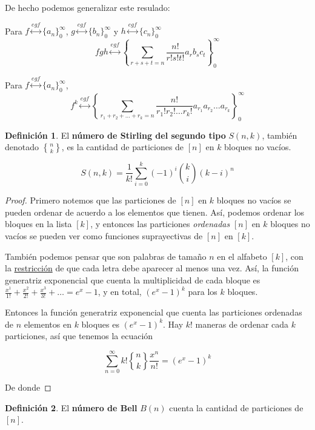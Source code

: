 \documentclass[spanish]{book}
\theoremstyle{definition}
\newtheorem*{defn}{Definición}
\DeclareRobustCommand{\stirling}{\genfrac\{\}{0pt}{}}
\begin{document}
De hecho podemos generalizar este resulado:
\begin{teo}	
	Para $f\overset{egf}{\longleftrightarrow}\{a_n\}_0^\infty$, $g\overset{egf}{\longleftrightarrow}\{b_n\}_0^\infty$ y $h\overset{egf}{\longleftrightarrow}\{c_n\}_0^\infty$
	\[fgh\overset{egf}{\longleftrightarrow}\left\{\sum_{r+s+t=n}\frac{n!}{r!s!t!}a_rb_sc_t\right\}_0^\infty\]
\end{teo}
\begin{teo}	
	Para $f\overset{egf}{\longleftrightarrow}\{a_n\}_0^\infty$,
	\[f^k\overset{egf}{\longleftrightarrow}\left\{\sum_{r_1+r_2+\ldots+r_k=n}\frac{n!}{r_1!r_2!\ldots r_k!}a_{r_1}a_{r_2}\ldots a_{r_k}\right\}_0^\infty\]
\end{teo}
\begin{defn}
	El \textbf{número de Stirling del segundo tipo} $S(n,k)$, también denotado $\stirling{n}{k}$, es la cantidad de particiones de $[n]$ en $k$ bloques no vacíos.
\end{defn}
\begin{teo}
	\[S(n,k)=\frac{1}{k!}\sum_{i=0}^k(-1)^i{k\choose i}(k-i)^n\]
\end{teo}
\begin{proof}
	Primero notemos que las particiones de $[n]$ en $k$ bloques no vacíos se pueden ordenar de acuerdo a los elementos que tienen. Así, podemos ordenar los bloques en la lista $[k]$, y entonces las particiones \textit{ordenadas} $[n]$ en $k$ bloques no vacíos se pueden	ver como funciones suprayectivas de $[n]$ en $[k]$.
	
	También podemos pensar que son palabras de tamaño $n$ en el alfabeto $[k]$, con la \hyperref[restr]{restricción} de que cada letra debe aparecer al menos una vez. Así, la función generatriz exponencial que cuenta la multiplicidad de cada bloque es $\frac{x^1}{1!}+\frac{x^2}{2!}+\frac{x^3}{3!}+\ldots=e^x-1$, y en total, $(e^x-1)^k$ para los $k$ bloques.
	
	Entonces la función generatriz exponencial que cuenta las particiones ordenadas de $n$ elementos en $k$ bloques es $(e^x-1)^k$. Hay $k!$ maneras de ordenar cada $k$ particiones, así que tenemos la ecuación 
	
	\[\sum_{n=0}^\infty k!\stirling{n}{k}\frac{x^n}{n!}=(e^x-1)^k\]
	
	De donde

\end{proof}
\begin{defn}
	El \textbf{número de Bell} $B(n)$ cuenta la cantidad de particiones de $[n]$.
\end{defn}
\end{document}
